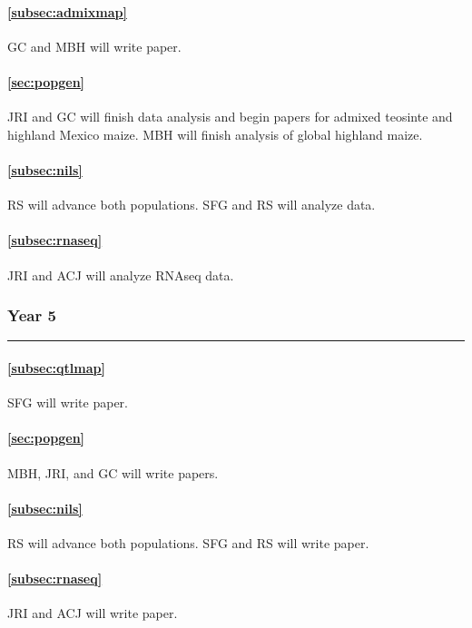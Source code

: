 \paragraph{  \bf  \ref{subsec:admixmap}} GC and MBH will write paper. 
\paragraph{  \bf  \ref{sec:popgen}} JRI and GC will finish data analysis and begin papers for admixed teosinte and highland Mexico maize. MBH will finish analysis of global highland maize. 
\paragraph{ \bf \ref{subsec:nils}} RS will advance both populations. SFG and RS will analyze data.
\paragraph{ \bf   \ref{subsec:rnaseq}} JRI and ACJ will analyze RNAseq data.

\subsubsection*{Year 5} \hrule \vspace{0.1cm}

\paragraph{  \bf \ref{subsec:qtlmap}} SFG will write paper.
\paragraph{  \bf  \ref{sec:popgen}} MBH, JRI, and GC will write papers.
\paragraph{ \bf \ref{subsec:nils}} RS will advance both populations. SFG and RS will write paper.
\paragraph{ \bf   \ref{subsec:rnaseq}} JRI and ACJ will write paper.